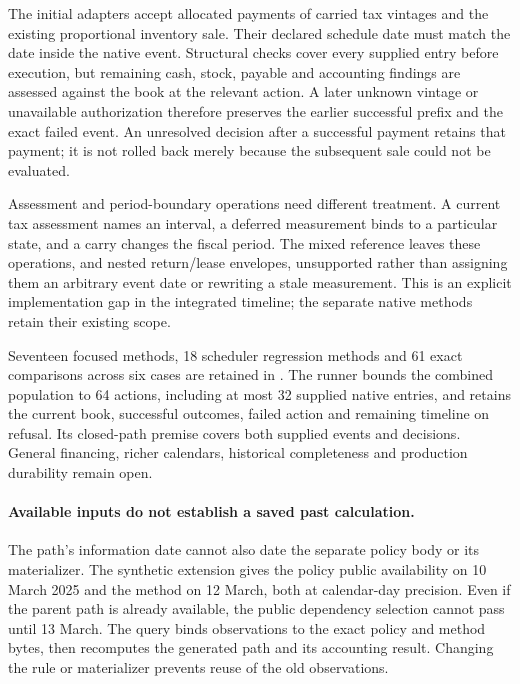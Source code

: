 The initial adapters accept allocated payments of carried tax vintages and the
existing proportional inventory sale. Their declared schedule date must match
the date inside the native event. Structural checks cover every supplied entry
before execution, but remaining cash, stock, payable and accounting findings
are assessed against the book at the relevant action. A later unknown vintage
or unavailable authorization therefore preserves the earlier successful prefix
and the exact failed event. An unresolved decision after a successful payment
retains that payment; it is not rolled back merely because the subsequent sale
could not be evaluated.

Assessment and period-boundary operations need different treatment. A current
tax assessment names an interval, a deferred measurement binds to a particular
state, and a carry changes the fiscal period. The mixed reference leaves these
operations, and nested return/lease envelopes, unsupported rather than assigning
them an arbitrary event date or rewriting a stale measurement. This is an
explicit implementation gap in the integrated timeline; the separate native
methods retain their existing scope.

Seventeen focused methods, 18 scheduler regression methods and 61 exact
comparisons across six cases are retained in
. The runner bounds
the combined population to 64 actions, including at most 32 supplied native
entries, and retains the current book, successful outcomes, failed action and
remaining timeline on refusal. Its closed-path premise covers both supplied
events and decisions. General financing, richer calendars, historical
completeness and production durability remain open.


\paragraph{Available inputs do not establish a saved past calculation.}
The path's information date cannot also date the separate policy body or its
materializer. The synthetic extension gives the policy public availability on
10 March 2025 and the method on 12 March, both at calendar-day precision.
Even if the parent path is already available, the public dependency selection
cannot pass until 13 March. The query binds observations to the exact policy
and method bytes, then recomputes the generated path and its accounting result.
Changing the rule or materializer prevents reuse of the old observations.

